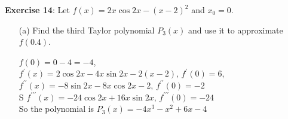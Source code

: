\documentclass{article}
\begin{document}
\textbf{Exercise 14}:
    Let $f(x) = 2x\cos{2x} - (x - 2)^{2}$ and $x_{0} = 0$.
        \begin{itemize}
            \item [(a)] Find the third Taylor polynomial $P_{3}(x)$ and use it to approximate $f(0.4)$.
                \begin{answer}
                    $f(0) = 0 - 4 = -4$, \\
                    $f^{\prime}(x) = 2 \cos{2x} - 4x \sin{2x} - 2(x - 2), \, f^{\prime}(0) = 6$, \\
                    $f^{\prime\prime}(x) = - 8 \sin{2x} - 8x \cos{2x} - 2, \, f^{\prime\prime}(0) = -2$ \\
         S           $f^{\prime\prime\prime}(x) = -24 \cos{2x} + 16x \sin{2x}, \, f^{\prime\prime\prime}(0) = -24$ \\
                    So the polynomial is $P_{3}(x) = -4x^{3} -x^{2} + 6x - 4$
                \end{answer}


\end{itemize}
\end{document}
